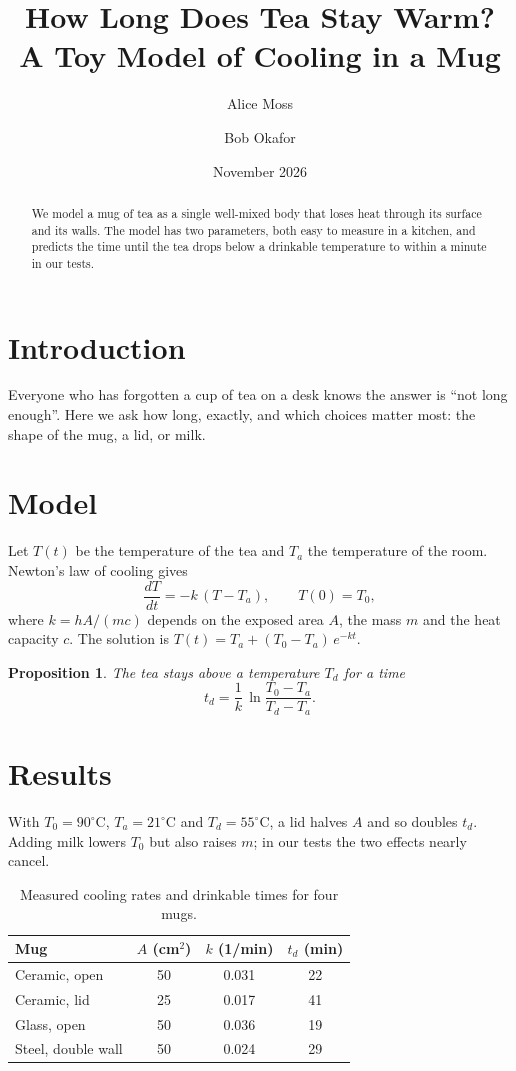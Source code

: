 \documentclass[11pt]{article}
\title{How Long Does Tea Stay Warm?\\\large A Toy Model of Cooling in a Mug}
\author{Alice Moss \and Bob Okafor}
\date{November 2026}
\newtheorem{proposition}{Proposition}
\begin{document}
\maketitle

\begin{abstract}
We model a mug of tea as a single well-mixed body that loses heat through its surface and its walls.
The model has two parameters, both easy to measure in a kitchen, and predicts the time until the tea
drops below a drinkable temperature to within a minute in our tests.
\end{abstract}

\section{Introduction}
Everyone who has forgotten a cup of tea on a desk knows the answer is ``not long enough''.
Here we ask how long, exactly, and which choices matter most: the shape of the mug, a lid, or milk.

\section{Model}
Let $T(t)$ be the temperature of the tea and $T_a$ the temperature of the room. Newton's law of cooling gives
\begin{equation}
  \frac{dT}{dt} = -k\,(T - T_a), \qquad T(0) = T_0,
  \label{eq:newton}
\end{equation}
where $k = hA/(mc)$ depends on the exposed area $A$, the mass $m$ and the heat capacity $c$.
The solution is $T(t) = T_a + (T_0 - T_a)\,e^{-kt}$.

\begin{proposition}
The tea stays above a temperature $T_d$ for a time
\[
  t_d = \frac{1}{k}\,\ln\frac{T_0 - T_a}{T_d - T_a}.
\]
\end{proposition}

\section{Results}
With $T_0 = 90^\circ$C, $T_a = 21^\circ$C and $T_d = 55^\circ$C, a lid halves $A$ and so doubles $t_d$.
Adding milk lowers $T_0$ but also raises $m$; in our tests the two effects nearly cancel.

\begin{table}[ht]
  \centering
  \begin{tabular}{lccc}
    Mug & $A$ (cm$^2$) & $k$ (1/min) & $t_d$ (min) \\
    \hline
    Ceramic, open & 50 & 0.031 & 22 \\
    Ceramic, lid & 25 & 0.017 & 41 \\
    Glass, open & 50 & 0.036 & 19 \\
    Steel, double wall & 50 & 0.024 & 29 \\
  \end{tabular}
  \caption{Measured cooling rates and drinkable times for four mugs.}
  \label{tab:mugs}
\end{table}
\end{document}
